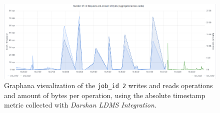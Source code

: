 \begin{figure}[h!]
	\centering
	\includegraphics[width=\textwidth]{figs/255653_mpi_io_luster_no_coll.pdf}
	\caption{Graphana visualization of the \texttt{job\_id 2}
          writes and reads operations and amount of bytes per
          operation, using the absolute timestamp metric collected
          with \emph{Darshan LDMS Integration}.}
	\label{f:mpi_io_grafana}
      \end{figure}
